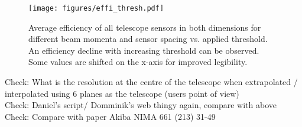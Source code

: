 \begin{figure}[hbtp]
\centering
\texttt{[image: figures/effi\_thresh.pdf]}
\caption[Overall telescope sensor efficiency vs. threshold for different beam
momenta and sensor spacings]{Average efficiency of all telescope sensors in both
dimensions for different beam momenta and sensor spacing vs. applied threshold.
An efficiency decline with increasing threshold can be observed. Some values are
shifted on the x-axis for improved legibility.}
\label{fig:effi_thresh}
\end{figure}


\noindent Check: What is the resolution at the centre of the telescope when extrapolated / interpolated using 6 planes as the telescope (users point of view)\\
Check: Daniel's script/ Domminik's web thingy again, compare with above\\
Check: Compare with paper Akiba NIMA 661 (213) 31-49
